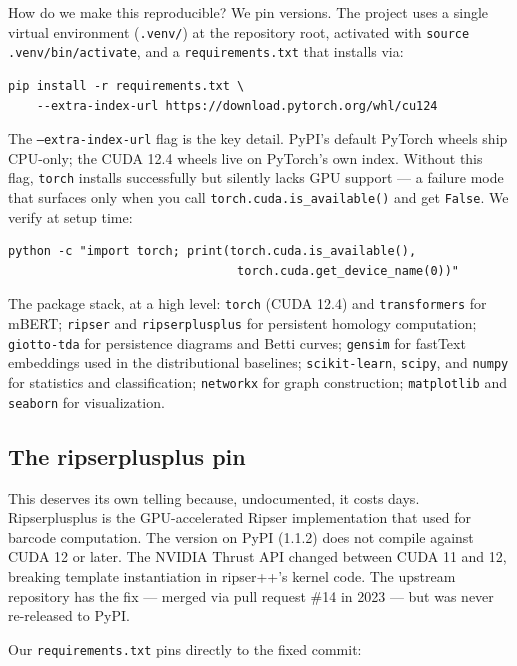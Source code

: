 How do we make this reproducible? We pin versions. The project uses a single virtual environment (\texttt{.venv/}) at the repository root, activated with \texttt{source .venv/bin/activate}, and a \texttt{requirements.txt} that installs via:

\begin{verbatim}
pip install -r requirements.txt \
    --extra-index-url https://download.pytorch.org/whl/cu124
\end{verbatim}

The \texttt{--extra-index-url} flag is the key detail. PyPI's default PyTorch wheels ship CPU-only; the CUDA 12.4 wheels live on PyTorch's own index. Without this flag, \texttt{torch} installs successfully but silently lacks GPU support --- a failure mode that surfaces only when you call \texttt{torch.cuda.is\_available()} and get \texttt{False}. We verify at setup time:

\begin{verbatim}
python -c "import torch; print(torch.cuda.is_available(),
                                torch.cuda.get_device_name(0))"
\end{verbatim}

The package stack, at a high level: \texttt{torch} (CUDA 12.4) and \texttt{transformers} for mBERT; \texttt{ripser} and \texttt{ripserplusplus} for persistent homology computation; \texttt{giotto-tda} for persistence diagrams and Betti curves; \texttt{gensim} for fastText embeddings used in the distributional baselines; \texttt{scikit-learn}, \texttt{scipy}, and \texttt{numpy} for statistics and classification; \texttt{networkx} for graph construction; \texttt{matplotlib} and \texttt{seaborn} for visualization.

\subsection{The ripserplusplus pin}

This deserves its own telling because, undocumented, it costs days. Ripserplusplus is the GPU-accelerated Ripser implementation that \textcite{kushnareva2021} used for barcode computation. The version on PyPI (1.1.2) does not compile against CUDA 12 or later. The NVIDIA Thrust API changed between CUDA 11 and 12, breaking template instantiation in ripser++'s kernel code. The upstream repository has the fix --- merged via pull request \#14 in 2023 --- but was never re-released to PyPI.

Our \texttt{requirements.txt} pins directly to the fixed commit:

